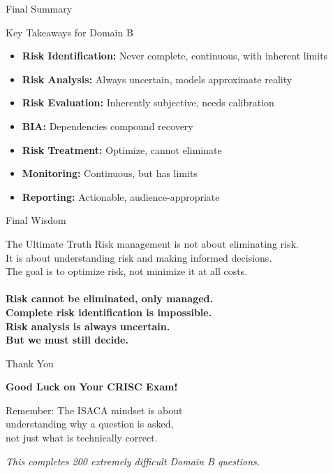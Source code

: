 \documentclass{beamer}
\begin{document}
	\begin{frame}{Final Summary}
		\begin{block}{Key Takeaways for Domain B}
			\begin{itemize}
				\item \textbf{Risk Identification:} Never complete, continuous, with inherent limits
				\item \textbf{Risk Analysis:} Always uncertain, models approximate reality
				\item \textbf{Risk Evaluation:} Inherently subjective, needs calibration
				\item \textbf{BIA:} Dependencies compound recovery
				\item \textbf{Risk Treatment:} Optimize, cannot eliminate
				\item \textbf{Monitoring:} Continuous, but has limits
				\item \textbf{Reporting:} Actionable, audience-appropriate
			\end{itemize}
		\end{block}
	\end{frame}
	
	\begin{frame}{Final Wisdom}
		\begin{alertblock}{The Ultimate Truth}
			Risk management is not about eliminating risk.\\
			It is about understanding risk and making informed decisions.\\
			The goal is to optimize risk, not minimize it at all costs.\\
			\\
			\textbf{Risk cannot be eliminated, only managed.}\\
			\textbf{Complete risk identification is impossible.}\\
			\textbf{Risk analysis is always uncertain.}\\
			\textbf{But we must still decide.}
		\end{alertblock}
	\end{frame}
	
	\begin{frame}{Thank You}
		\begin{center}
			\Huge
			\textbf{Good Luck on Your CRISC Exam!}
			
			\vspace{1cm}
			
			\normalsize
			Remember: The ISACA mindset is about\\
			understanding why a question is asked,\\
			not just what is technically correct.
			
			\vspace{1cm}
			
			\textit{This completes 200 extremely difficult Domain B questions.}
		\end{center}
	\end{frame}
	
\end{document}
